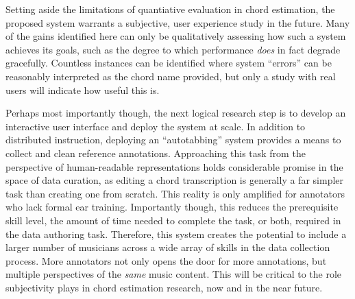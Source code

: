 Setting aside the limitations of quantiative evaluation in chord estimation, the proposed system warrants a subjective, user experience study in the future.
Many of the gains identified here can only be qualitatively assessing how such a system achieves its goals, such as the degree to which performance \emph{does} in fact degrade gracefully.
Countless instances can be identified where system ``errors'' can be reasonably interpreted as the chord name provided, but only a study with real users will indicate how useful this is.

Perhaps most importantly though, the next logical research step is to develop an interactive user interface and deploy the system at scale.
In addition to distributed instruction, deploying an ``autotabbing'' system provides a means to collect and clean reference annotations.
Approaching this task from the perspective of human-readable representations holds considerable promise in the space of data curation, as editing a chord transcription is generally a far simpler task than creating one from scratch.
This reality is only amplified for annotators who lack formal ear training.
Importantly though, this reduces the prerequisite skill level, the amount of time needed to complete the task, or both, required in the data authoring task.
Therefore, this system creates the potential to include a larger number of musicians across a wide array of skills in the data collection process.
More annotators not only opens the door for more annotations, but multiple perspectives of the \emph{same} music content.
This will be critical to the role subjectivity plays in chord estimation research, now and in the near future.


